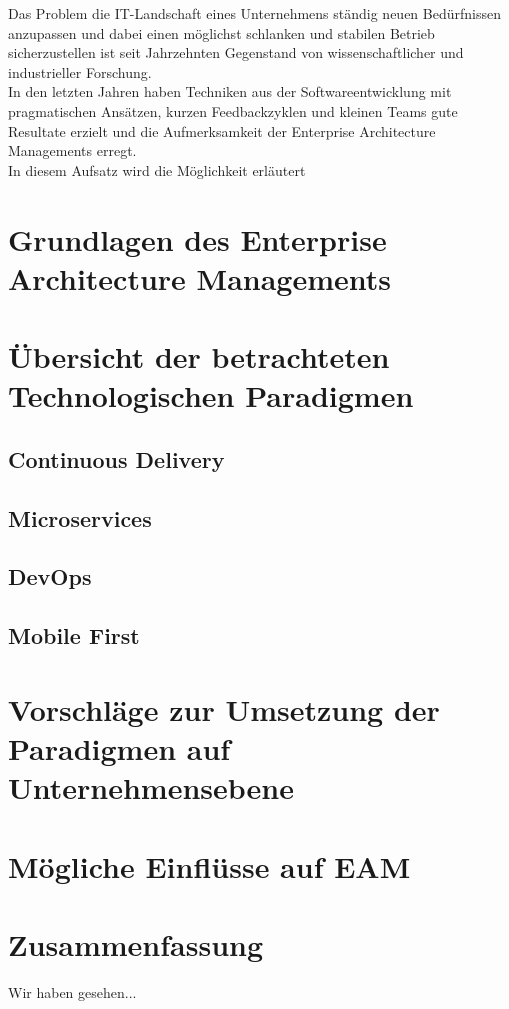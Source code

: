 \documentclass{llncs}
\begin{document}
Das Problem die IT-Landschaft eines Unternehmens ständig neuen Bedürfnissen anzupassen und dabei einen möglichst
schlanken und stabilen Betrieb sicherzustellen ist seit Jahrzehnten Gegenstand von wissenschaftlicher und industrieller Forschung.\\

In den letzten Jahren haben Techniken aus der Softwareentwicklung mit pragmatischen Ansätzen, kurzen Feedbackzyklen und kleinen Teams gute Resultate erzielt und die Aufmerksamkeit der Enterprise Architecture Managements erregt\cite{buc:mat}.\\

In diesem Aufsatz wird die Möglichkeit erläutert



%
\section{Grundlagen des Enterprise Architecture Managements}


%
\section{Übersicht der betrachteten Technologischen Paradigmen}

%
\subsection{Continuous Delivery}

%
\subsection{Microservices}
\subsection{DevOps}
\subsection{Mobile First}
\section{Vorschläge zur Umsetzung der Paradigmen auf Unternehmensebene}
\section{Mögliche Einflüsse auf EAM}
\section{Zusammenfassung}
Wir haben gesehen...
\end{document}
